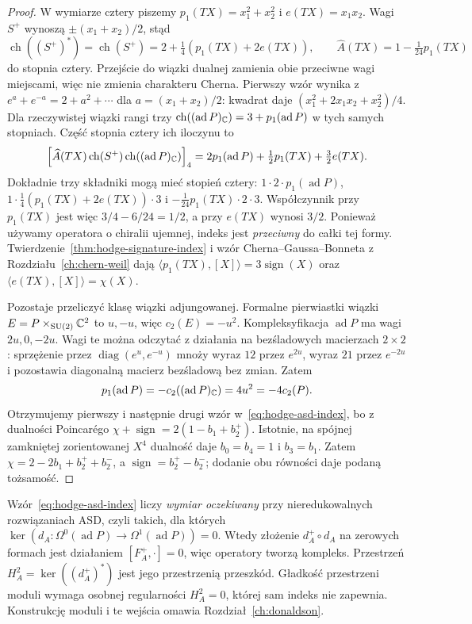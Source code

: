 \begin{proof}
W wymiarze cztery piszemy
\(p_1(TX)=x_1^2+x_2^2\) i
\(e(TX)=x_1x_2\). Wagi \(S^+\)
wynoszą \(\pm(x_1+x_2)/2\), stąd
\[
 \operatorname{ch}((S^+)^*)=\operatorname{ch}(S^+)
 =2+\tfrac14(p_1(TX)+2e(TX)),\qquad
 \widehat A(TX)=1-\tfrac1{24}p_1(TX)
\]
do stopnia cztery.
Przejście do wiązki dualnej zamienia obie przeciwne
wagi miejscami, więc nie zmienia charakteru Cherna.
Pierwszy wzór wynika z
$e^a+e^{-a}=2+a^2+\cdots$ dla $a=(x_1+x_2)/2$:
kwadrat daje $(x_1^2+2x_1x_2+x_2^2)/4$.
Dla rzeczywistej
wiązki rangi trzy
\(\operatorname{ch}((\operatorname{ad}P)_{\mathbb{C}})
=3+p_1(\operatorname{ad}P)\)
w tych samych stopniach. Część
stopnia cztery ich iloczynu to
\[
 \left[
 \widehat A(TX)\operatorname{ch}(S^+)
 \operatorname{ch}((\operatorname{ad}P)_{\mathbb{C}})
 \right]_4
 =2p_1(\operatorname{ad}P)
  +\tfrac12p_1(TX)+\tfrac32e(TX).
\]
Dokładnie trzy składniki mogą mieć stopień cztery:
$1\cdot2\cdot p_1(\operatorname{ad}P)$,
$1\cdot\frac14(p_1(TX)+2e(TX))\cdot3$
i $-\frac1{24}p_1(TX)\cdot2\cdot3$.
Współczynnik przy $p_1(TX)$ jest więc
$3/4-6/24=1/2$, a przy $e(TX)$ wynosi $3/2$.
Ponieważ używamy operatora o chiralii
ujemnej, indeks jest \emph{przeciwny}
do całki tej formy.
Twierdzenie~\ref{thm:hodge-signature-index}
i wzór Cherna--Gaussa--Bonneta
z Rozdziału~\ref{ch:chern-weil} dają
\(\langle p_1(TX),[X]\rangle
=3\operatorname{sign}(X)\) oraz
\(\langle e(TX),[X]\rangle=\chi(X)\).

Pozostaje przeliczyć klasę wiązki
adjungowanej. Formalne pierwiastki
wiązki \(E=P\times_{\mathrm{SU}(2)}\mathbb{C}^2\)
to \(u,-u\), więc \(c_2(E)=-u^2\).
Kompleksyfikacja \(\operatorname{ad}P\)
ma wagi \(2u,0,-2u\).
Wagi te można odczytać z działania na bezśladowych
macierzach $2\times2$:
sprzężenie przez $\operatorname{diag}(e^u,e^{-u})$
mnoży wyraz $12$ przez $e^{2u}$, wyraz $21$ przez $e^{-2u}$
i pozostawia diagonalną macierz bezśladową bez zmian.
Zatem
\[
 p_1(\operatorname{ad}P)
 =-c_2((\operatorname{ad}P)_{\mathbb{C}})
 =4u^2=-4c_2(P).
\]
Otrzymujemy pierwszy i następnie
drugi wzór w~\eqref{eq:hodge-asd-index},
bo z dualności Poincarégo
\(\chi+\operatorname{sign}
=2(1-b_1+b_2^+)\).
Istotnie, na spójnej zamkniętej zorientowanej $X^4$
dualność daje $b_0=b_4=1$ i $b_3=b_1$.
Zatem $\chi=2-2b_1+b_2^++b_2^-$,
a $\operatorname{sign}=b_2^+-b_2^-$;
dodanie obu równości daje podaną tożsamość.
\end{proof}

Wzór~\eqref{eq:hodge-asd-index} liczy
\emph{wymiar oczekiwany} przy nieredukowalnych rozwiązaniach ASD,
czyli takich, dla których $\ker(d_A:\Omega^0(\operatorname{ad}P)
\to\Omega^1(\operatorname{ad}P))=0$.
Wtedy złożenie $d_A^+\circ d_A$ na zerowych formach
jest działaniem $[F_A^+,\cdot]=0$, więc operatory tworzą kompleks.
Przestrzeń $H_A^2=\ker((d_A^+)^*)$ jest jego przestrzenią przeszkód.
Gładkość
przestrzeni moduli wymaga osobnej
regularności \(H_A^2=0\), której
sam indeks nie zapewnia.
Konstrukcję moduli i te wejścia
omawia Rozdział~\ref{ch:donaldson}.

